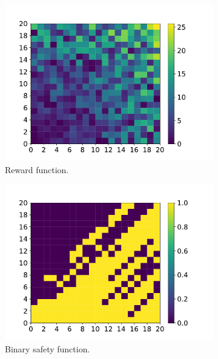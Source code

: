 \documentclass[letterpaper]{article} %
\begin{document}
\begin{figure}[t]
    \centering
    \begin{subfigure}[b]{0.33\textwidth}
        \centering
        \includegraphics[width=\textwidth]{figures/reward.pdf}
        \caption{Reward function.}
        \label{fig:reward}
    \end{subfigure}
    \hfill
    \begin{subfigure}[b]{0.33\textwidth}
        \centering
        \includegraphics[width=\textwidth]{figures/safety.pdf}
        \caption{Binary safety function.}
        \label{fig:safety}
    \end{subfigure}
    \hfill
    \begin{subfigure}[b]{0.33\textwidth}

\end{subfigure}
\end{figure}
\end{document}
